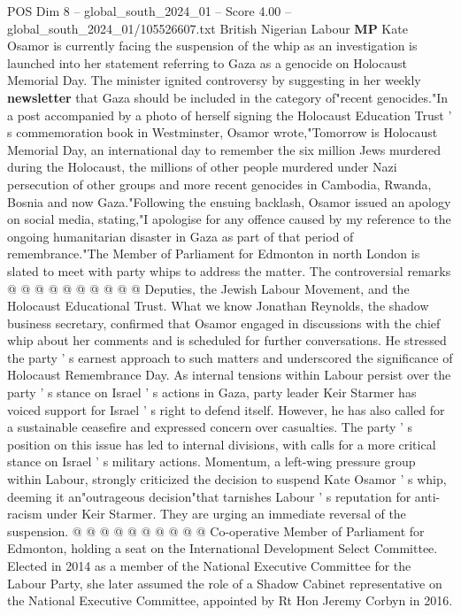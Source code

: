 \begin{textsample}{POS Dim 8 – global\_south\_2024\_01 – Score 4.00 – global\_south\_2024\_01/105526607.txt}  \label{ex:f8_pos_392}
British Nigerian Labour \textbf{MP} Kate Osamor is currently facing the suspension of the whip as an investigation is launched into her statement referring to Gaza as a genocide on Holocaust Memorial Day.
The minister ignited controversy by suggesting in her weekly \textbf{newsletter} that Gaza should be included in the category of"recent genocides."In a post accompanied by a photo of herself signing the Holocaust Education Trust ' s commemoration book in Westminster, Osamor wrote,"Tomorrow is Holocaust Memorial Day, an international day to remember the six million Jews murdered during the Holocaust, the millions of other people murdered under Nazi persecution of other groups and more recent genocides in Cambodia, Rwanda, Bosnia and now Gaza."Following the ensuing backlash, Osamor issued an apology on social media, stating,"I apologise for any offence caused by my reference to the ongoing humanitarian disaster in Gaza as part of that period of remembrance."The Member of Parliament for Edmonton in north London is slated to meet with party whips to address the matter.
The controversial remarks @ @ @ @ @ @ @ @ @ @ Deputies, the Jewish Labour Movement, and the Holocaust Educational Trust.
What we know Jonathan Reynolds, the shadow business secretary, confirmed that Osamor engaged in discussions with the chief whip about her comments and is scheduled for further conversations.
He stressed the party ' s earnest approach to such matters and underscored the significance of Holocaust Remembrance Day.
As internal tensions within Labour persist over the party ' s stance on Israel ' s actions in Gaza, party leader Keir Starmer has voiced support for Israel ' s right to defend itself.
However, he has also called for a sustainable ceasefire and expressed concern over casualties.
The party ' s position on this issue has led to internal divisions, with calls for a more critical stance on Israel ' s military actions.
Momentum, a left-wing pressure group within Labour, strongly criticized the decision to suspend Kate Osamor ' s whip, deeming it an"outrageous decision"that tarnishes Labour ' s reputation for anti-racism under Keir Starmer.
They are urging an immediate reversal of the suspension. @ @ @ @ @ @ @ @ @ @ Co-operative Member of Parliament for Edmonton, holding a seat on the International Development Select Committee.
Elected in 2014 as a member of the National Executive Committee for the Labour Party, she later assumed the role of a Shadow Cabinet representative on the National Executive Committee, appointed by Rt Hon Jeremy Corbyn in 2016.

\end{textsample}
